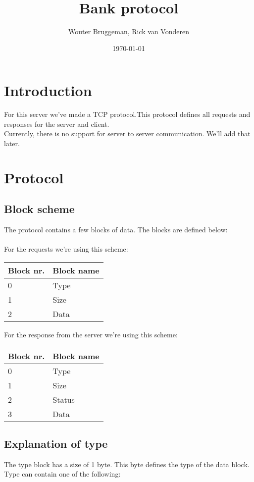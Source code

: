 \documentclass[12pt, a4paper]{article}
\title{Bank protocol}
\author{Wouter Bruggeman, Rick van Vonderen}
\date{\today}
\begin{document}
\maketitle
\newpage

\tableofcontents
\newpage

\section{Introduction}
For this server we've made a TCP protocol.This protocol defines all requests
and responses for the server and client.\\
Currently, there is no support for server to server communication. We'll add that later.\\
\newpage

\section{Protocol}
\subsection{Block scheme}
The protocol contains a few blocks of data. The blocks are defined below:\\
\\
For the requests we're using this scheme:\\
\begin{tabular}{| p{2cm} | p{5cm} |}
	\hline
	\textbf{Block nr.} & \textbf{Block name} \\ \hline
	0 & Type \\ \hline
	1 & Size \\ \hline
	2 & Data \\ \hline
\end{tabular}

For the response from the server we're using this scheme:\\
\begin{tabular}{| p{2cm} | p{5cm} |}
	\hline
	\textbf{Block nr.} & \textbf{Block name} \\ \hline
	0 & Type \\ \hline
	1 & Size \\ \hline
	2 & Status \\ \hline
	3 & Data \\ \hline
\end{tabular}

\newpage

\subsection{Explanation of type}
The type block has a size of 1 byte. This byte defines the type of the data block.\\
Type can contain one of the following:\\
\end{document}
